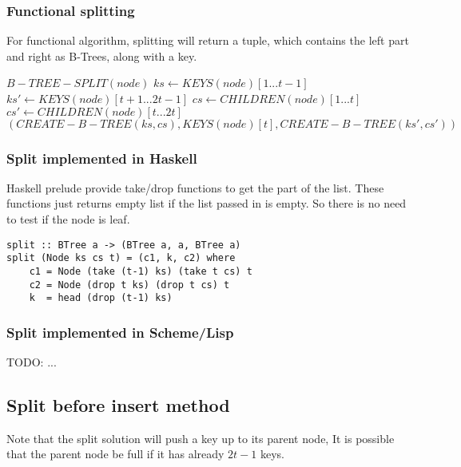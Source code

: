 \documentclass{article}
\begin{document}
\subsubsection{Functional splitting}

For functional algorithm, splitting will return a tuple, which contains the
left part and right as B-Trees, along with a key.

\begin{algorithmic}
\STATE $B-TREE-SPLIT(node)$
  \STATE $ks \leftarrow KEYS(node)[1 ... t-1]$
  \STATE $ks' \leftarrow KEYS(node)[t+1 ... 2t-1]$
    \STATE $cs \leftarrow CHILDREN(node)[1 ... t]$
    \STATE $cs' \leftarrow CHILDREN(node)[t ... 2t]$
  \ENDIF
  \RETURN $(CREATE-B-TREE(ks, cs), KEYS(node)[t], CREATE-B-TREE(ks', cs'))$
\end{algorithmic}

\subsubsection*{Split implemented in Haskell}
Haskell prelude provide take/drop functions to get the part
of the list. These functions just returns empty list if the 
list passed in is empty. So there is no need to test if
the node is leaf.

\lstset{language=Haskell}
\begin{lstlisting}
split :: BTree a -> (BTree a, a, BTree a)
split (Node ks cs t) = (c1, k, c2) where
    c1 = Node (take (t-1) ks) (take t cs) t
    c2 = Node (drop t ks) (drop t cs) t
    k  = head (drop (t-1) ks)
\end{lstlisting}

\subsubsection*{Split implemented in Scheme/Lisp}
TODO: ...

\subsection{Split before insert method}
\label{split before insertion}

Note that the split solution will push a key up to its parent node,
It is possible that the parent node be full if it has already 
$2t-1$ keys.
\end{document}
